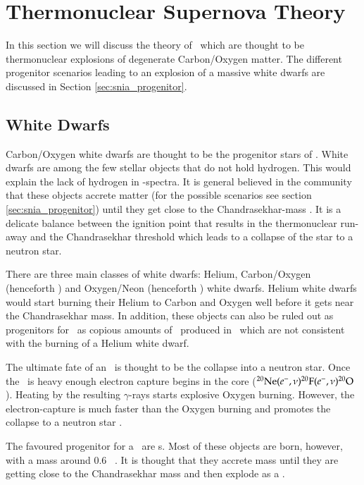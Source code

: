 \section{Thermonuclear Supernova Theory}
In this section we will discuss the theory of \sneia\ which are thought to be thermonuclear explosions of degenerate Carbon/Oxygen matter. The different progenitor scenarios leading to an explosion of a massive white dwarfs are discussed in Section \ref{sec:snia_progenitor}.

\subsection{White Dwarfs}
\label{sec:white_dwarfs}
Carbon/Oxygen white dwarfs are thought to be the progenitor stars of \sneia. White dwarfs are among the few stellar objects that do not hold hydrogen. This would explain the lack of hydrogen in \snia-spectra. It is general believed in the community that these objects accrete matter (for the possible scenarios see section \ref{sec:snia_progenitor}) until they get close to the Chandrasekhar-mass \citep[henceforth \mchan;][]{1931ApJ....74...81C}. It is a delicate balance between the ignition point that results in the thermonuclear run-away and the Chandrasekhar threshold which leads to a collapse of the star to a neutron star.
 
There are three main classes of white dwarfs: Helium, Carbon/Oxygen (henceforth \cowd) and Oxygen/Neon (henceforth \onemgwd) white dwarfs. Helium white dwarfs would start burning their Helium to Carbon and Oxygen well before it gets near the Chandrasekhar mass. In addition, these objects can also be ruled out as progenitors for \sneia\ as copious amounts of \ige\ produced in \sneia\, which are not consistent with the burning of a Helium white dwarf. 

The ultimate fate of an \onemgwd\ is thought to be the collapse into a neutron star. Once the \onemgwd\ is heavy enough electron capture begins in the core ($\Ne(e^-,\nu)\F[20](e^-,\nu)\Ox[20]$). Heating by the resulting $\gamma$-rays starts explosive Oxygen burning. However, the electron-capture is much faster than the Oxygen burning and promotes the collapse to a neutron star \citep{1991ApJ...367L..19N, 2005A&A...435..231G}. 

The favoured progenitor for a \snia\  are \cowd s. Most of these objects are born, however, with a mass around 0.6 \msun\ \citep{2007MNRAS.375.1315K}. It is thought that they accrete mass until they are getting close to the Chandrasekhar mass and then explode as a \snia.

